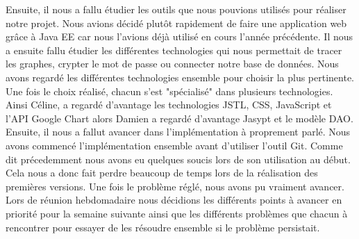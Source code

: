 Ensuite, il nous a fallu étudier les outils que nous pouvions utilisés pour réaliser notre projet. Nous avions décidé plutôt rapidement de faire une application web grâce à Java EE car nous l'avions déjà utilisé en cours l'année précédente. Il nous a ensuite fallu étudier les différentes technologies qui nous permettait de tracer les graphes, crypter le mot de passe ou connecter notre base de données. Nous avons regardé les différentes technologies ensemble pour choisir la plus pertinente. Une fois le choix réalisé, chacun s'est "spécialisé" dans plusieurs technologies. Ainsi Céline, a regardé d'avantage les technologies JSTL, CSS, JavaScript et l'API Google Chart alors Damien a regardé d'avantage Jasypt et le modèle DAO. \\

Ensuite, il nous a fallut avancer dans l'implémentation à proprement parlé. Nous avons commencé l'implémentation ensemble avant d'utiliser l'outil Git. Comme dit précedemment nous avons eu quelques soucis lors de son utilisation au début. Cela nous a donc fait perdre beaucoup de temps lors de la réalisation des premières versions. Une fois le problème réglé, nous avons pu vraiment avancer. Lors de réunion hebdomadaire nous décidions les différents points à avancer en priorité pour la semaine suivante ainsi que les différents problèmes que chacun à rencontrer pour essayer de les résoudre ensemble si le problème persistait. 

